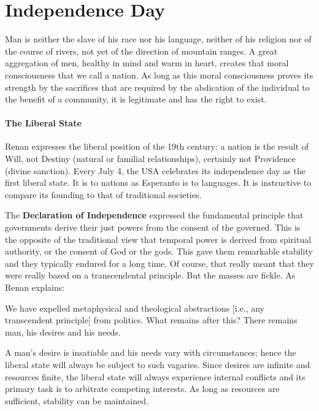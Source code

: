 \section{Independence Day}

\begin{quotex}
Man is neither the slave of his race nor his language, neither of his religion nor of the course of rivers, not yet of the direction of mountain ranges. A great aggregation of men, healthy in mind and warm in heart, creates that moral consciousness that we call a nation. As long as this moral consciousness proves its strength by the sacrifices that are required by the abdication of the individual to the benefit of a community, it is legitimate and has the right to exist. 

\end{quotex}
\paragraph{The Liberal State}
Renan expresses the liberal position of the 19th century: a nation is the result of Will, not Destiny (natural or familial relationships), certainly not Providence (divine sanction). Every July 4, the USA celebrates its independence day as the first liberal state. It is to nations as Esperanto is to languages. It is instructive to compare its founding to that of traditional societies.

The \textbf{Declaration of Independence} expressed the fundamental principle that governments derive their just powers from the consent of the governed. This is the opposite of the traditional view that temporal power is derived from spiritual authority, or the consent of God or the gods. This gave them remarkable stability and they typically endured for a long time. Of course, that really meant that they were really based on a transcendental principle. But the masses are fickle. As Renan explains:

\begin{quotex}
We have expelled metaphysical and theological abstractions [i.e., any transcendent principle] from politics. What remains after this? There remains man, his desires and his needs.

\end{quotex}


A man's desire is insatiable and his needs vary with circumstances; hence the liberal state will always be subject to such vagaries. Since desires are infinite and resources finite, the liberal state will always experience internal conflicts and its primary task is to arbitrate competing interests. As long as resources are sufficient, stability can be maintained.

